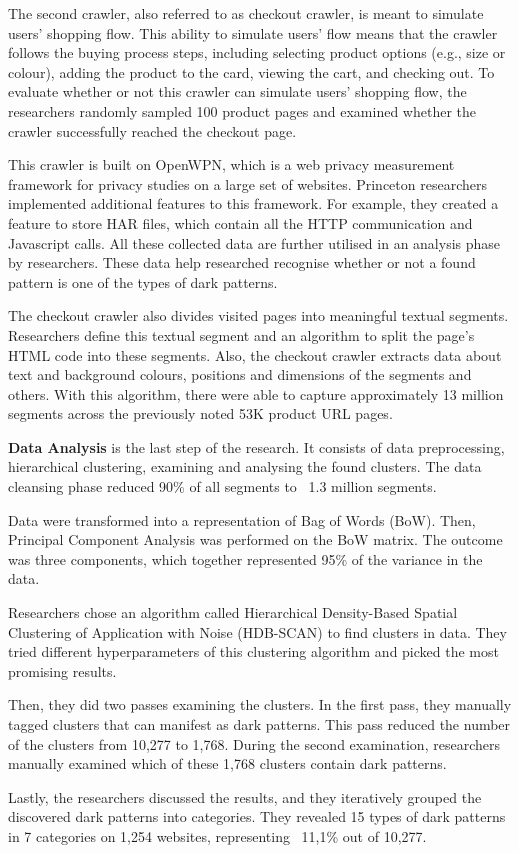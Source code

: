 The second crawler, also referred to as checkout crawler, is meant to simulate users' shopping flow.  This ability to simulate users' flow means that the crawler follows the buying process steps, including selecting product options (e.g., size or colour), adding the product to the card, viewing the cart, and checking out. To evaluate whether or not this crawler can simulate users' shopping flow, the researchers randomly sampled 100 product pages and examined whether the crawler successfully reached the checkout page.

This crawler is built on OpenWPN, which is a web privacy measurement framework for privacy studies on a large set of websites. Princeton researchers implemented additional features to this framework. For example, they created a feature to store HAR files, which contain all the HTTP communication and Javascript calls. All these collected data are further utilised in an analysis phase by researchers. These data help researched recognise whether or not a found pattern is one of the types of dark patterns.

The checkout crawler also divides visited pages into meaningful textual segments. Researchers define this textual segment and an algorithm to split the page's HTML code into these segments\cite{dark-patterns-at-scale}. Also, the checkout crawler extracts data about text and background colours, positions and dimensions of the segments and others. With this algorithm, there were able to capture approximately 13 million segments across the previously noted 53K product URL pages.

\textbf{Data Analysis} is the last step of the research. It consists of data preprocessing, hierarchical clustering, examining and analysing the found clusters. The data cleansing phase reduced 90\% of all segments to ~1.3 million segments.

Data were transformed into a representation of Bag of Words (BoW)\cite{bag-of-words}. Then, Principal Component Analysis was performed on the BoW matrix. The outcome was three components, which together represented 95\% of the variance in the data. 

Researchers chose an algorithm called Hierarchical Density-Based Spatial Clustering of Application with Noise (HDB-SCAN)\cite{hdbscan} to find clusters in data. They tried different hyperparameters of this clustering algorithm and picked the most promising results.

Then, they did two passes examining the clusters. In the first pass, they manually tagged clusters that can manifest as dark patterns. This pass reduced the number of the clusters from 10,277 to 1,768.  During the second examination, researchers manually examined which of these 1,768 clusters contain dark patterns\cite{dark-patterns-at-scale}.

Lastly, the researchers discussed the results, and they iteratively grouped the discovered dark patterns into categories. They revealed 15 types of dark patterns in 7 categories on 1,254 websites, representing ~11,1\% out of 10,277\cite{dark-patterns-at-scale}.




